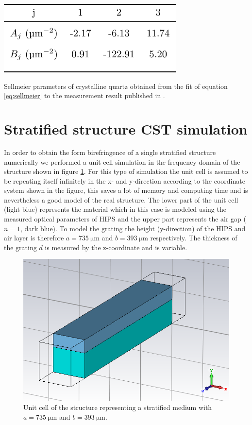 \begin{table}[H]
    \centering
    \includegraphics[scale=0.9]{images/7_appendix/sellmeier_parameters_table.pdf}
    \caption{Sellmeier parameters of crystalline quartz obtained from the fit of equation \ref{eq:sellmeier} to the measurement result published in \cite{DGrischkowsky1990}.}
    \label{tab:sellmeier_parameters_table}
\end{table}

\section{Stratified structure CST simulation}
\label{sec:CST simulation}
In order to obtain the form birefringence of a single stratified structure numerically we performed a unit cell simulation in the frequency domain of the structure shown in figure \ref{fig:CST_model}. For this type of simulation the unit cell is assumed to be repeating itself infinitely in the x- and y-direction according to the coordinate system shown in the figure, this saves a lot of memory and computing time and is nevertheless a good model of the real structure. The lower part of the unit cell (light blue) represents the material which in this case is modeled using the measured optical parameters of HIPS and the upper part represents the air gap ($n=1$, dark blue). To model the grating the height (y-direction) of the HIPS and air layer is therefore $a=\SI{735}{\micro \meter}$ and $b=\SI{393}{\micro \meter}$ respectively. The thickness of the grating $d$ is measured by the z-coordinate and is variable. 

\begin{figure}[H]
    \centering
    \includegraphics[scale=0.3]{images/7_appendix/CST.PNG}
    \caption{Unit cell of the structure representing a stratified medium with $a=\SI{735}{\micro \meter}$ and $b=\SI{393}{\micro \meter}$.}
    \label{fig:CST_model}
\end{figure}

